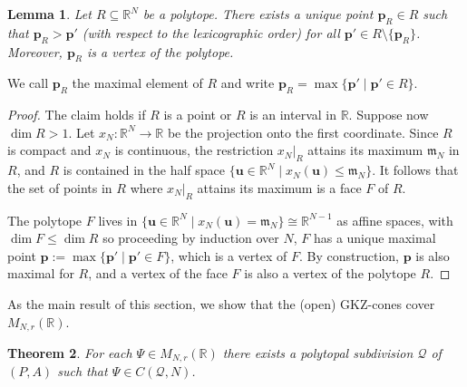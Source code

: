 \documentclass[12pt, a4article]{amsart}   	%
\numberwithin{equation}{section}
\theoremstyle{plain}
\newtheorem{theorem}{Theorem}[section]
\newtheorem{lemma}[theorem]{Lemma}
\theoremstyle{definition}
\newcommand{\R}{{\mathbb R}}
\newcommand{\mcQ}{{\mathcal Q}}
\newcommand{\MNaR}{M_{N,r}(\R)}
\begin{document}
\begin{lemma}\label{lemma:max:in:polytope}
Let  $R\subseteq \mathbb R^{N}$ be a polytope. There exists a unique point 
$\mathbf p_R\in R$ such that $\mathbf p_R>\mathbf p'$ (with respect to the lexicographic order) 
for all $\mathbf p'\in R\setminus\{\mathbf p_R\}$. Moreover, 
$\mathbf p_R$ is a vertex of the polytope.
\end{lemma}

We call $\mathbf p_R$ the maximal element of $R$ and write $\mathbf p_R=\max\{\mathbf p'\mid \mathbf p'\in R\}$.

\begin{proof}
The claim holds if $R$ is a point or $R$ is an interval in $\mathbb R$. Suppose now
$\dim R> 1$. Let $x_N:\mathbb R^N\rightarrow \mathbb R$ be the projection onto the first coordinate.
Since $R$ is compact and $x_N$ is continuous, the restriction $x_N\vert_R$ attains its maximum $\mathfrak m_N$ 
in $R$, and $R$ is contained in the half space $\{\mathbf u\in \mathbb R^N\mid x_N(\mathbf u)\le \mathfrak m_N\}$.
It follows that the set of points in $R$ where $x_N\vert_R$ attains its maximum is a face $F$ of $R$.

The  polytope $F$ lives in $\{\mathbf u\in \mathbb R^N\mid x_N(\mathbf u)=\mathfrak m_N\}\cong\mathbb R^{N-1}$ as affine spaces, with $\dim F\le \dim R$ so proceeding by induction over $N$, $F$ has a unique maximal point $\mathbf  p:=\max\{\mathbf  p'\mid \mathbf p'\in F\}$, which is a vertex of $F$. By construction, $\mathbf  p$ is also maximal for $R$, and a vertex of the face $F$ is also a vertex of the polytope $R$.
\end{proof}

As the main result of this section, we show that the (open) GKZ-cones cover $M_{N,r}(\mathbb{R})$.

\begin{theorem}\label{thm:gkz:complete}
For each $\Psi\in \MNaR$ there exists a polytopal subdivision $\mcQ$ of $(P,A)$ such that $\Psi\in C(\mcQ,N)$.
\end{theorem}
\end{document}
